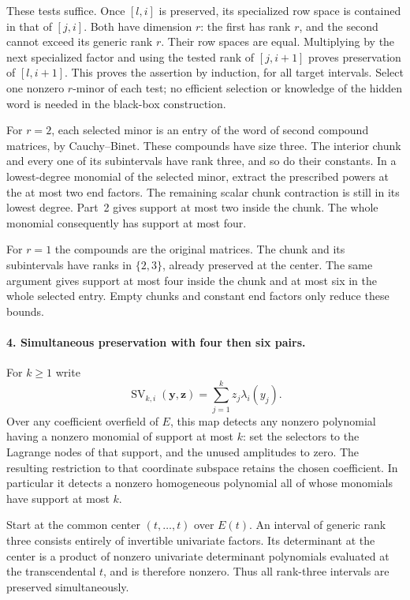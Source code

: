 \documentclass[11pt,a4paper]{article}
\theoremstyle{definition}\newtheorem{definition}{Definition}
\begin{document}
These tests suffice.  Once $[l,i]$ is preserved, its specialized
row space is contained in that of $[j,i]$.  Both have dimension
$r$: the first has rank $r$, and the second cannot exceed its
generic rank $r$.  Their row spaces are equal.  Multiplying by
the next specialized factor and using the tested rank of
$[j,i+1]$ proves preservation of $[l,i+1]$.  This proves the
assertion by induction, for all target intervals.  Select one
nonzero $r$-minor of each test; no efficient selection or knowledge
of the hidden word is needed in the black-box construction.

For $r=2$, each selected minor is an entry of the word of second
compound matrices, by Cauchy--Binet.  These compounds have size
three.  The interior chunk and every one of its subintervals have
rank three, and so do their constants.  In a lowest-degree
monomial of the selected minor, extract the prescribed powers at
the at most two end factors.  The remaining scalar chunk
contraction is still in its lowest degree.  Part~2 gives support
at most two inside the chunk.  The whole monomial consequently
has support at most four.

For $r=1$ the compounds are the original matrices.  The chunk and
its subintervals have ranks in $\{2,3\}$, already preserved at
the center.  The same argument gives support at most four
inside the chunk and at most six in the whole selected entry.
Empty chunks and constant end factors only reduce these bounds.

\paragraph{4. Simultaneous preservation with four then six pairs.}
For $k\ge1$ write
\[
 \operatorname{SV}_{k,i}(\mathbf y,\mathbf z)
      =\sum_{j=1}^kz_j\lambda_i(y_j).
\]
Over any coefficient overfield of $E$, this map detects any
nonzero polynomial having a nonzero monomial of support at most
$k$: set the selectors to the Lagrange nodes of that support,
and the unused amplitudes to zero.  The resulting restriction
to that coordinate subspace retains the chosen coefficient.
In particular it detects a nonzero homogeneous polynomial all
of whose monomials have support at most $k$.

Start at the common center $(t,\ldots,t)$ over $E(t)$.
An interval of generic rank three consists entirely of invertible
univariate factors.  Its determinant at the center is a product
of nonzero univariate determinant polynomials evaluated at the
transcendental $t$, and is therefore nonzero.  Thus all rank-three
intervals are preserved simultaneously.
\end{document}
